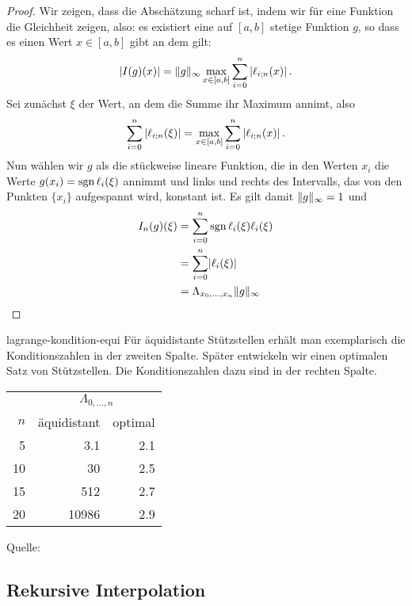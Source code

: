 \begin{proof}
  Wir zeigen, dass die Abschätzung scharf ist, indem wir für eine
  Funktion die Gleichheit zeigen, also: es existiert eine auf $[a,b]$
  stetige Funktion $g$, so dass es einen Wert $x\in [a,b]$ gibt an dem gilt:
  \begin{gather}
    \lvert I(g)(x)\rvert
    = \lVert g\rVert_\infty \max_{x\in [a,b]} \sum_{i=0}^n \left\vert \ell_{i;n}(x)\right\vert.
  \end{gather}
  Sei zunächst $\xi$ der Wert, an dem die Summe ihr Maximum annimt, also
  \begin{gather}
    \sum_{i=0}^n\left\vert \ell_{i;n}(\xi)\right\vert
    = \max_{x\in [a,b]} \sum_{i=0}^n\left\vert \ell_{i;n}(x)\right\vert.
  \end{gather}
  Nun wählen wir $g$ als die stückweise lineare Funktion, die in den
  Werten $x_i$ die Werte
  $g(x_i) = \operatorname{sgn} \ell_i(\xi)$ annimmt und links und rechts des Intervalls, das von den Punkten $\{x_i\}$ aufgespannt wird, konstant ist. Es gilt damit $\lVert g\rVert_\infty = 1$ und
  \begin{align}
    I_n(g)(\xi)
    &= \sum_{i=0}^n  \operatorname{sgn} \ell_i(\xi) \ell_i(\xi) \\
    &= \sum_{i=0}^n  \lvert\ell_i(\xi)\rvert \\
    &= \Lambda_{x_0,\dots,x_n} \lVert g\rVert_\infty
  \end{align}
\end{proof}

\begin{Beispiel}{lagrange-kondition-equi}
  Für äquidistante Stützstellen erhält man exemplarisch die Konditionszahlen in der zweiten Spalte. Später entwickeln wir einen optimalen Satz von Stützstellen. Die Konditionszahlen dazu sind in der rechten Spalte.
  \begin{center}
    \begin{tabular}{r|rr}
      & \multicolumn{2}{c}{ $\Lambda_{0,\dots,n}$}\\
      $n$ & äquidistant & optimal\\\hline
      5 & 3.1 & 2.1\\
      10 & 30 & 2.5 \\
      15 & 512 & 2.7 \\
      20 & 10986 & 2.9
    \end{tabular}
  \end{center}
  Quelle: \cite{DeuflhardHohmann08}
\end{Beispiel}

\subsection{Rekursive Interpolation}

